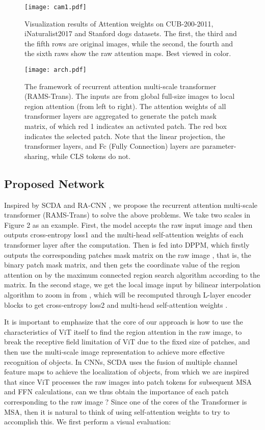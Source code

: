 \documentclass[sigconf]{acmart}
\begin{document}
\begin{figure}[h]
\centering
\texttt{[image: cam1.pdf]}
\caption{Visualization results of Attention weights on CUB-200-2011, iNaturalist2017 and Stanford dogs datasets. The first, the third and the fifth rows are original images, while the second, the fourth and the sixth raws show the raw attention maps. Best viewed in color.}
\end{figure}

\begin{figure*}[t]
\centering
\texttt{[image: arch.pdf]}
\caption{The framework of recurrent attention multi-scale transformer (RAMS-Trans). The inputs are from global full-size images to local region attention (from left to right). The attention weights of all transformer layers are aggregated to generate the patch mask matrix, of which red 1 indicates an activated patch. The red box indicates the selected patch. Note that the linear projection, the transformer layers, and Fc (Fully Connection) layers are parameter-sharing, while CLS tokens do not.}
\end{figure*}


\subsection{Proposed Network}
Inspired by SCDA \cite{SCDA} and RA-CNN \cite{RA-CNN}, we propose the recurrent attention multi-scale transformer (RAMS-Trans) to solve the above problems. We take two scales in Figure 2 as an example. First, the model accepts the raw input image  and then outputs cross-entropy loss1 and the multi-head self-attention weights  of each transformer layer after the computation. Then  is fed into DPPM, which firstly outputs the corresponding patches mask matrix on the raw image , that is, the binary patch mask matrix, and then gets the coordinate value of the region attention on  by the maximum connected region search algorithm according to the matrix. In the second stage, we get the local image input  by bilinear interpolation algorithm to zoom in from , which will be recomputed through L-layer encoder blocks to get cross-entropy loss2 and multi-head self-attention weights .

It is important to emphasize that the core of our approach is how to use the characteristics of ViT itself to find the region attention in the raw image, to break the receptive field limitation of ViT due to the fixed size of patches, and then use the multi-scale image representation to achieve more effective recognition of objects. In CNNs, SCDA uses the fusion of multiple channel feature maps to achieve the localization of objects, from which we are inspired that since ViT processes the raw images into patch tokens for subsequent MSA and FFN calculations, can we thus obtain the importance of each patch corresponding to the raw image ? Since one of the cores of the Transformer is MSA, then it is natural to think of using self-attention weights to try to accomplish this. We first perform a visual evaluation:
\end{document}
